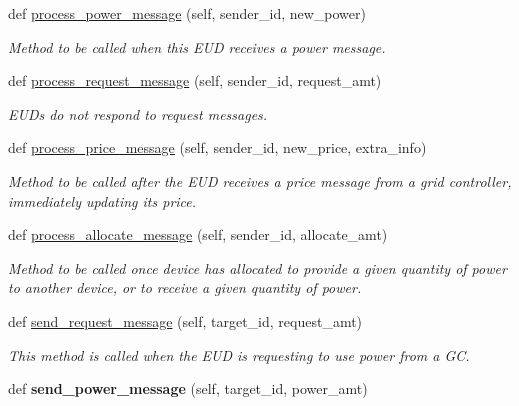 \begin{DoxyCompactItemize}
def \hyperlink{class_build_1_1_objects_1_1eud_1_1_eud_a5105203c22df5b2e9c1754b8889563df}{process\+\_\+power\+\_\+message} (self, sender\+\_\+id, new\+\_\+power)
\begin{DoxyCompactList}\small\item\em Method to be called when this E\+UD receives a power message. \end{DoxyCompactList}\item 
def \hyperlink{class_build_1_1_objects_1_1eud_1_1_eud_a4e9b1ca4c510a1f405f5d16b31215cbe}{process\+\_\+request\+\_\+message} (self, sender\+\_\+id, request\+\_\+amt)
\begin{DoxyCompactList}\small\item\em E\+UD\textquotesingle{}s do not respond to request messages. \end{DoxyCompactList}\item 
def \hyperlink{class_build_1_1_objects_1_1eud_1_1_eud_abef38cebc5b66f6cb03f58f2900b9a93}{process\+\_\+price\+\_\+message} (self, sender\+\_\+id, new\+\_\+price, extra\+\_\+info)
\begin{DoxyCompactList}\small\item\em Method to be called after the E\+UD receives a price message from a grid controller, immediately updating its price. \end{DoxyCompactList}\item 
def \hyperlink{class_build_1_1_objects_1_1eud_1_1_eud_af02e4338062f37389c04e87d9d5f9f63}{process\+\_\+allocate\+\_\+message} (self, sender\+\_\+id, allocate\+\_\+amt)
\begin{DoxyCompactList}\small\item\em Method to be called once device has allocated to provide a given quantity of power to another device, or to receive a given quantity of power. \end{DoxyCompactList}\item 
def \hyperlink{class_build_1_1_objects_1_1eud_1_1_eud_a13b6abd062b9b88597dc83c9c7813fdc}{send\+\_\+request\+\_\+message} (self, target\+\_\+id, request\+\_\+amt)
\begin{DoxyCompactList}\small\item\em This method is called when the E\+UD is requesting to use power from a GC. \end{DoxyCompactList}\item 
\mbox{\label{class_build_1_1_objects_1_1eud_1_1_eud_a45a3f08a0d82e961c9244f54fe446608}} 
def {\bfseries send\+\_\+power\+\_\+message} (self, target\+\_\+id, power\+\_\+amt)

\end{DoxyCompactItemize}
